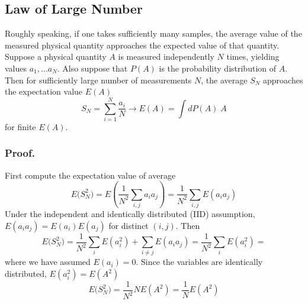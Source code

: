 \documentclass[../../../main.tex]{subfiles}
\begin{document}
\subsection{Law of Large Number}
Roughly speaking, if one takes sufficiently many samples, the average value of the measured physical quantity approaches the expected value of that quantity.
Suppose a physical quantity $A$ is measured independently $N$ times, yielding values $a_1,\dots a_N$.
Also suppose that $P(A)$ is the probability distribution of $A$.
Then for sufficiently large number of measurements $N$, the average $S_N$ approaches the expectation value $E(A)$
\begin{equation*}
S_N=\sum_{i=1}^N\frac{a_i}{N}\rightarrow
E(A)=\int dP(A)\;A 
\end{equation*}
for finite $E(A)$.

\subsubsection{Proof.}
First compute the expectation value of average
\begin{equation*}
E\big(S_N^2\big) = E \left( \frac{1}{N^2}\sum_{i,j} a_i a_j \right) = \frac{1}{N^2}\sum_{i,j} E(a_i a_j)
\end{equation*}
Under the independent and identically distributed (IID) assumption, $E(a_ia_j)=E(a_i)E(a_j)$ for distinct $(i,j)$.
Then
\begin{equation*}
E\big(S_N^2\big) 
= 
\frac{1 }{N^2}\sum_i E(a_i^2) + \sum_{i\neq j} E(a_i a_j)
=\frac{1 }{N^2} \sum_i E(a_i^2) = 
\end{equation*}
where we have assumed $E(a_i)=0$.
Since the variables are identically distributed, $E(a_i^2)=E(A^2)$
\begin{equation*}
E\big(S_N^2\big) 
= 
\frac{1 }{N^2} N E(A^2)
=
\frac{1 }{N} E(A^2)
\end{equation*}
\end{document}
